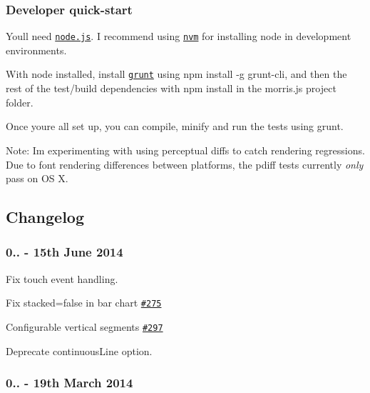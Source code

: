 \subsubsection*{Developer quick-\/start}

You\textquotesingle{}ll need \href{https://nodejs.org}{\tt node.\+js}. I recommend using \href{https://github.com/creationix/nvm}{\tt nvm} for installing node in development environments.

With node installed, install \href{https://github.com/cowboy/grunt}{\tt grunt} using {\ttfamily npm install -\/g grunt-\/cli}, and then the rest of the test/build dependencies with {\ttfamily npm install} in the morris.\+js project folder.

Once you\textquotesingle{}re all set up, you can compile, minify and run the tests using {\ttfamily grunt}.

Note\+: I\textquotesingle{}m experimenting with using perceptual diffs to catch rendering regressions. Due to font rendering differences between platforms, the pdiff tests currently {\itshape only} pass on OS X.

\subsection*{Changelog}

\subsubsection*{0.. -\/ 15th June 2014}


\begin{DoxyItemize}
\item Fix touch event handling.
\item Fix stacked=false in bar chart \href{https://github.com/morrisjs/morris.js/issues/275}{\tt \#275}
\item Configurable vertical segments \href{https://github.com/morrisjs/morris.js/issues/297}{\tt \#297}
\item Deprecate continuous\+Line option.
\end{DoxyItemize}

\subsubsection*{0.. -\/ 19th March 2014}


